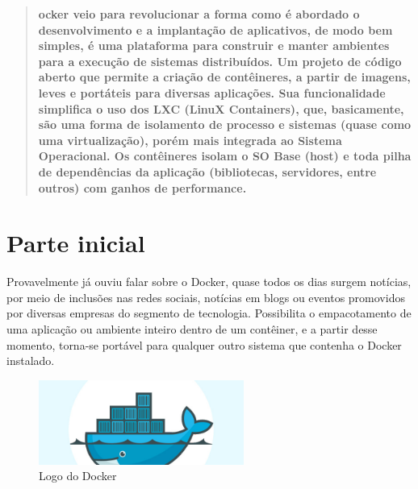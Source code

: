 \documentclass[a4paper,11pt]{article}
\begin{document}
	
\maketitle %
\thispagestyle{fancy} %

\begin{abstract}
	\textbf{ocker\cite{dockeroficial} veio para revolucionar a forma como é abordado o desenvolvimento e a implantação de aplicativos, de modo bem simples, é uma plataforma para construir e manter ambientes para a execução de sistemas distribuídos. Um projeto de código aberto que permite a criação de contêineres, a partir de imagens, leves e portáteis para diversas aplicações. Sua funcionalidade simplifica o uso dos LXC (LinuX Containers), que, basicamente, são uma forma de isolamento de processo e sistemas (quase como uma virtualização), porém mais integrada ao Sistema Operacional. Os contêineres isolam o SO Base (host) e toda pilha de dependências da aplicação (bibliotecas, servidores, entre outros) com ganhos de performance.}
\end{abstract}

\section{Parte inicial}
Provavelmente já ouviu falar sobre o Docker, quase todos os dias surgem notícias, por meio de inclusões nas redes sociais, notícias em blogs ou eventos promovidos por diversas empresas do segmento de tecnologia. Possibilita o empacotamento de uma aplicação ou ambiente inteiro dentro de um contêiner, e a partir desse momento, torna-se portável para qualquer outro sistema que contenha o Docker instalado.
\begin{figure}[H]
	\centering
	\includegraphics[width=0.6\textwidth]{imagem/DockerLogo.jpg}
	\caption{Logo do Docker}
\end{figure}
\end{document}
